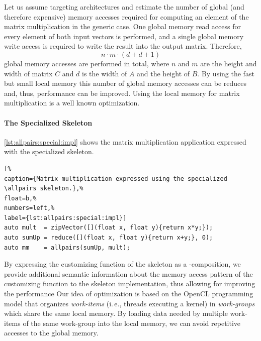 Let us assume targeting \GPU architectures and estimate the number of global (and therefore expensive) memory accesses required for computing an element of the matrix multiplication in the generic case.
One global memory read access for every element of both input vectors is performed, and a single global memory write access is required to write the result into the output matrix.
Therefore, 
\begin{equation}
  n\cdot m\cdot (d + d + 1)
  \label{eq:mm:accesses}
\end{equation}
global memory accesses are performed in total, where $n$ and $m$ are the height and width of matrix $C$ and $d$ is the width of $A$ and the height of $B$.
By using the fast but small local memory this number of global memory accesses can be reduces and, thus, performance can be improved.
Using the local memory for matrix multiplication is a well known optimization.

\paragraph{The Specialized \allpairs Skeleton}
\autoref{lst:allpairs:special:impl} shows the matrix multiplication application expressed with the specialized \allpairs skeleton.
\begin{lstlisting}[%                                                             
caption={Matrix multiplication expressed using the specialized \allpairs skeleton.},%
float=b,%                                                                       
numbers=left,%
label={lst:allpairs:special:impl}]
auto mult  = zipVector([](float x, float y){return x*y;});
auto sumUp = reduce([](float x, float y){return x+y;}, 0);
auto mm    = allpairs(sumUp, mult);
\end{lstlisting}
%
By expressing the customizing function of the \allpairs skeleton as a \zip-\reduce composition, we provide additional semantic information about the memory access pattern of the customizing function to the skeleton implementation, thus allowing for improving the performance
Our idea of optimization is based on the OpenCL programming model that organizes \emph{work-items} (i.\,e., threads executing a kernel) in \emph{work-groups} which share the same \GPU local memory.
By loading data needed by multiple work-items of the same work-group into the local memory, we can avoid repetitive accesses to the global memory.

